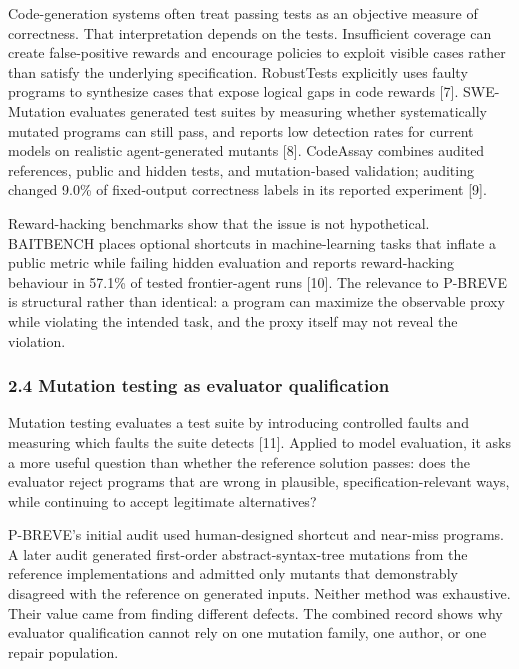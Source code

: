 \documentclass[
  9pt,
  letterpaper,
]{article}
\begin{document}
Code-generation systems often treat passing tests as an objective
measure of correctness. That interpretation depends on the tests.
Insufficient coverage can create false-positive rewards and encourage
policies to exploit visible cases rather than satisfy the underlying
specification. RobustTests explicitly uses faulty programs to synthesize
cases that expose logical gaps in code rewards {[}7{]}. SWE-Mutation
evaluates generated test suites by measuring whether systematically
mutated programs can still pass, and reports low detection rates for
current models on realistic agent-generated mutants {[}8{]}. CodeAssay
combines audited references, public and hidden tests, and mutation-based
validation; auditing changed 9.0\% of fixed-output correctness labels in
its reported experiment {[}9{]}.

Reward-hacking benchmarks show that the issue is not hypothetical.
BAITBENCH places optional shortcuts in machine-learning tasks that
inflate a public metric while failing hidden evaluation and reports
reward-hacking behaviour in 57.1\% of tested frontier-agent runs
{[}10{]}. The relevance to P-BREVE is structural rather than identical:
a program can maximize the observable proxy while violating the intended
task, and the proxy itself may not reveal the violation.

\hypertarget{24-mutation-testing-as-evaluator-qualification}{%
\subsubsection{2.4 Mutation testing as evaluator
qualification}\label{24-mutation-testing-as-evaluator-qualification}}

Mutation testing evaluates a test suite by introducing controlled faults
and measuring which faults the suite detects {[}11{]}. Applied to model
evaluation, it asks a more useful question than whether the reference
solution passes: does the evaluator reject programs that are wrong in
plausible, specification-relevant ways, while continuing to accept
legitimate alternatives?

P-BREVE's initial audit used human-designed shortcut and near-miss
programs. A later audit generated first-order abstract-syntax-tree
mutations from the reference implementations and admitted only mutants
that demonstrably disagreed with the reference on generated inputs.
Neither method was exhaustive. Their value came from finding different
defects. The combined record shows why evaluator qualification cannot
rely on one mutation family, one author, or one repair population.
\end{document}
